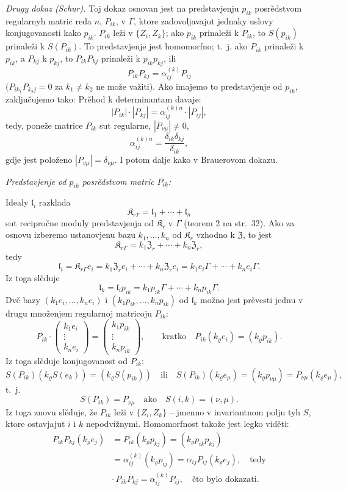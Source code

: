 \documentclass[11pt]{article}
\begin{document}
\emph{Drugy dokaz (Schur).} Toj dokaz osnovan jest na predstavjenju \(p_{ik}\) posrědstvom regularnyh matric reda \(n\), \(P_{ik}\), v \(\Gamma\), ktore zadovoljavajut jednaky uslovy konjugovanosti kako \(p_{ik}\). \(P_{ik}\) leži v \(\{Z_i,Z_k\}\); ako \(p_{ik}\) prinaleži k \(P_{ik}\), to \(S(p_{ik})\) prinaleži k \(S(P_{ik})\). To predstavjenje jest homomorfno; t.~j. ako \(P_{ik}\) prinaleži k \(p_{ik}\), a \(P_{kj}\) k \(p_{kj}\), to \(P_{ik}P_{kj}\) prinaleži k \(p_{ik}p_{kj}\), ili
\[
P_{ik}P_{kj}=\alpha_{ij}^{(k)}P_{ij}
\]
\((P_{ik_1}P_{k_2j}=0\) za \(k_1\neq k_2\) ne može važiti). Ako imajemo to predstavjenje od \(p_{ik}\), zaključujemo tako: Prěhod k determinantam davaje:
\[
|P_{ik}|\cdot |P_{kj}|=\alpha_{ij}^{(k)n}\cdot |P_{ij}|,
\]
tedy, poneže matrice \(P_{ik}\) sut regularne, \(|P_{\nu\mu}|\ne0\),
\[
\alpha_{ij}^{(k)n}=\frac{\delta_{ik}\delta_{kj}}{\delta_{ik}},
\]
gdje jest položeno \(|P_{\nu\mu}|=\delta_{\nu\mu}\). I potom dalje kako v Brauerovom dokazu.

\emph{Predstavjenje od \(p_{ik}\) posrědstvom matric \(P_{ik}\):}

Idealy \(\mathfrak l_i\) razklada
\[
\mathfrak K_{r\Gamma}=\mathfrak l_1+\cdots+\mathfrak l_n
\]
sut recipročne moduly predstavjenja od \(\mathfrak K_r\) v \(\Gamma\) (teorem 2 na str.~32). Ako za osnovu izberemo ustanovjenu bazu \(k_1,\ldots,k_n\) od \(\mathfrak K_r\) vzhodno k \(\mathfrak Z\), to jest
\[
\mathfrak K_{r\Gamma}=k_1\mathfrak Z_r+\cdots+k_n\mathfrak Z_r,
\]
tedy
\[
\mathfrak l_i=\mathfrak K_{r\Gamma}e_i
=k_1\mathfrak Z_r e_i+\cdots+k_n\mathfrak Z_r e_i
=k_1e_i\Gamma+\cdots+k_ne_i\Gamma.
\]
Iz toga slěduje
\[
\mathfrak l_k=\mathfrak l_i p_{ik}
=k_1p_{ik}\Gamma+\cdots+k_np_{ik}\Gamma.
\]
Dvě bazy \((k_1e_i,\ldots,k_ne_i)\) i \((k_1p_{ik},\ldots,k_np_{ik})\) od \(\mathfrak l_k\) možno jest prěvesti jednu v drugu množenjem regularnoj matricoju \(P_{ik}\):
\[
P_{ik}\cdot
\begin{pmatrix}
k_1e_i\\ \vdots\\ k_ne_i
\end{pmatrix}
=
\begin{pmatrix}
k_1p_{ik}\\ \vdots\\ k_np_{ik}
\end{pmatrix},
\qquad
\text{kratko}\quad
P_{ik}(k_\varrho e_i)=(k_\varrho p_{ik}).
\]
Iz toga slěduje konjugovanost od \(P_{ik}\):
\[
S(P_{ik})(k_\varrho S(e_k))=(k_\varrho S(p_{ik}))
\quad\text{ili}\quad
S(P_{ik})(k_\varrho e_\mu)=(k_\varrho p_{\nu\mu})
=P_{\nu\mu}(k_\varrho e_\mu),
\]
t.~j.
\[
S(P_{ik})=P_{\nu\mu}\quad\text{ako}\quad S(i,k)=(\nu,\mu).
\]
Iz toga znovu slěduje, že \(P_{ik}\) leži v \(\{Z_i,Z_k\}\) -- jmenno v invariantnom polju tyh \(S\), ktore ostavjajut \(i\) i \(k\) nepodvižnymi. Homomorfnost takože jest legko viděti:
\[
\begin{split}
P_{ik}P_{kj}(k_\varrho e_j)
&=P_{ik}(k_\varrho p_{kj})
=(k_\varrho p_{ik}p_{kj})\\
&=\alpha_{ij}^{(k)}(k_\varrho p_{ij})
=\alpha_{ij}P_{ij}(k_\varrho e_j),
\quad\text{tedy}\\
&\cdot\, P_{ik}P_{kj}=\alpha_{ij}^{(k)}P_{ij},
\quad\text{čto bylo dokazati.}
\end{split}
\]
\end{document}
